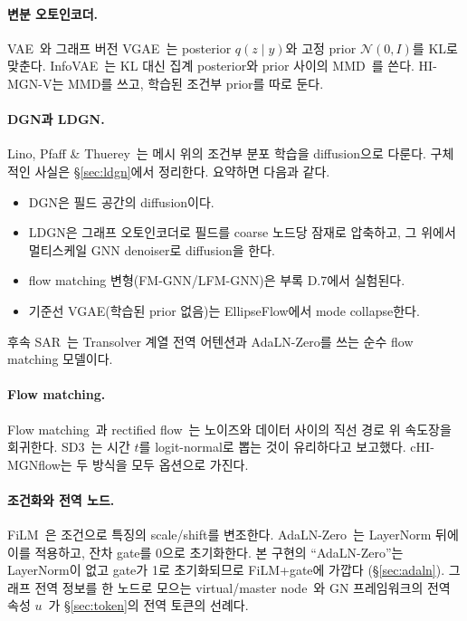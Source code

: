 \documentclass[11pt]{article}
\newcommand{\N}{\mathcal{N}}
\begin{document}
\paragraph{변분 오토인코더.} VAE~\cite{kingma2014}와 그래프 버전
VGAE~\cite{kipf2016}는 posterior $q(z\mid y)$와 고정 prior $\N(0,I)$를 KL로
맞춘다. InfoVAE~\cite{zhao2019}는 KL 대신 집계 posterior와 prior 사이의
MMD~\cite{gretton2012}를 쓴다. HI-MGN-V는 MMD를 쓰고, 학습된 조건부 prior를
따로 둔다.

\paragraph{DGN과 LDGN.} Lino, Pfaff \& Thuerey~\cite{lino2025}는 메시 위의
조건부 분포 학습을 diffusion으로 다룬다. 구체적인 사실은
\S\ref{sec:ldgn}에서 정리한다. 요약하면 다음과 같다.
\begin{itemize}
\item DGN은 필드 공간의 diffusion이다.
\item LDGN은 그래프 오토인코더로 필드를 coarse 노드당 잠재로 압축하고,
  그 위에서 멀티스케일 GNN denoiser로 diffusion을 한다.
\item flow matching 변형(FM-GNN/LFM-GNN)은 부록 D.7에서 실험된다.
\item 기준선 VGAE(학습된 prior 없음)는 EllipseFlow에서 mode collapse한다.
\end{itemize}
후속 SAR~\cite{lino2026sar}는 Transolver 계열 전역 어텐션과 AdaLN-Zero를
쓰는 순수 flow matching 모델이다.

\paragraph{Flow matching.} Flow matching~\cite{lipman2023}과
rectified flow~\cite{liu2023}는 노이즈와 데이터 사이의 직선 경로 위 속도장을
회귀한다. SD3~\cite{esser2024}는 시간 $t$를 logit-normal로 뽑는 것이 유리하다고
보고했다. cHI-MGNflow는 두 방식을 모두 옵션으로 가진다.

\paragraph{조건화와 전역 노드.} FiLM~\cite{perez2018}은 조건으로 특징의
scale/shift를 변조한다. AdaLN-Zero~\cite{peebles2023}는 LayerNorm 뒤에 이를
적용하고, 잔차 gate를 0으로 초기화한다. 본 구현의 ``AdaLN-Zero''는
LayerNorm이 없고 gate가 1로 초기화되므로 FiLM+gate에 가깝다
(\S\ref{sec:adaln}). 그래프 전역 정보를 한 노드로 모으는 virtual/master
node~\cite{gilmer2017}와 GN 프레임워크의 전역 속성 $u$~\cite{battaglia2018}가
\S\ref{sec:token}의 전역 토큰의 선례다.
\end{document}
